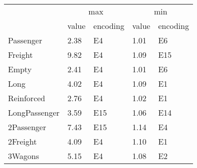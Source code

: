 \begin{tabular}{lllll}
\toprule
 & \multicolumn{2}{c}{max} & \multicolumn{2}{c}{min} \\
 & value & encoding & value & encoding \\
\midrule
Passenger & 2.38 & E4 & 1.01 & E6 \\
Freight & 9.82 & E4 & 1.09 & E15 \\
Empty & 2.41 & E4 & 1.01 & E6 \\
Long & 4.02 & E4 & 1.09 & E1 \\
Reinforced & 2.76 & E4 & 1.02 & E1 \\
LongPassenger & 3.59 & E15 & 1.06 & E14 \\
2Passenger & 7.43 & E15 & 1.14 & E4 \\
2Freight & 4.09 & E4 & 1.10 & E1 \\
3Wagons & 5.15 & E4 & 1.08 & E2 \\
\bottomrule
\end{tabular}
